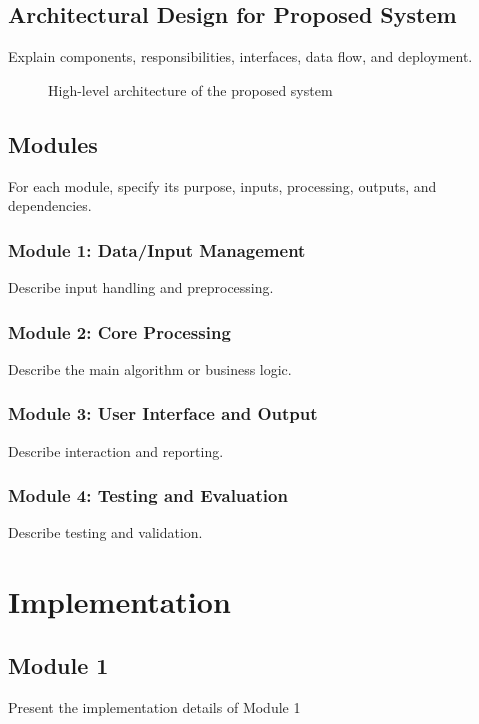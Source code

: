 \documentclass{ssnreview}
\begin{document}
\section{Architectural Design for Proposed System}
Explain components, responsibilities, interfaces, data flow, and deployment.
\begin{figure}[H]
\centering
{}
\caption{High-level architecture of the proposed system}\label{fig:architecture}
\end{figure}

\section{Modules}
For each module, specify its purpose, inputs, processing, outputs, and dependencies.
\subsection{Module 1: Data/Input Management} Describe input handling and preprocessing.
\subsection{Module 2: Core Processing} Describe the main algorithm or business logic.
\subsection{Module 3: User Interface and Output} Describe interaction and reporting.
\subsection{Module 4: Testing and Evaluation} Describe testing and validation.

\chapter{Implementation}

\section{Module 1}
   Present the implementation details of Module 1
  
\end{document}
